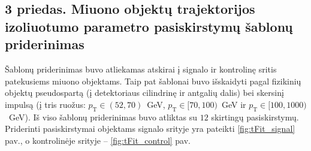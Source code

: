 \documentclass[a4paper, 12pt, oneside]{article}
\newcommand{\pT}{p_{\mathrm{T}}}
\begin{document}
\vspace{2cm}
\subsection*{3 priedas. Miuono objektų trajektorijos izoliuotumo parametro pasiskirstymų šablonų priderinimas}
Šablonų priderinimas buvo atliekamas atskirai į signalo ir kontrolinę sritis patekusiems miuono objektams.
Taip pat šablonai buvo išskaidyti pagal fizikinių objektų pseudospartą (į detektoriaus cilindrinę ir antgalių dalis)
bei skersinį impulsą (į tris ruožus: $\pT\!\in\!(52,70)$~GeV, $\pT\!\in\![70,100)$~GeV ir $\pT\!\in\![100,1000)$~GeV).
Iš viso šablonų priderinimas buvo atliktas su $12$ skirtingų pasiskirstymų.
Priderinti pasiskirstymai objektams signalo srityje yra pateikti \ref{fig:tFit_signal} pav., o kontrolinėje srityje --
\ref{fig:tFit_control} pav.
\end{document}
